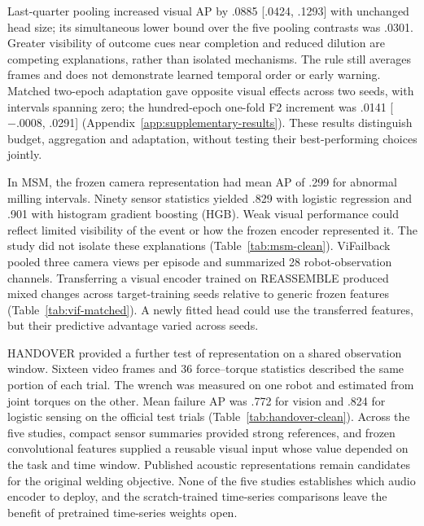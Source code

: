 Last-quarter pooling increased visual AP by .0885 [.0424, .1293] with unchanged head
size; its simultaneous lower bound over the five pooling contrasts was .0301. Greater
visibility of outcome cues near completion and reduced dilution are competing
explanations, rather than isolated mechanisms. The rule still averages frames and does
not demonstrate learned temporal order or early warning. Matched two-epoch adaptation
gave opposite visual effects across two seeds, with intervals spanning zero; the
hundred-epoch one-fold F2 increment was .0141 [$-.0008$, .0291]
(Appendix~\ref{app:supplementary-results}). These results distinguish budget,
aggregation and adaptation, without testing their best-performing choices jointly.

In MSM, the frozen camera representation had mean AP of .299 for abnormal milling
intervals. Ninety sensor statistics yielded .829 with logistic regression and .901 with
histogram gradient boosting (HGB). Weak visual performance could reflect limited
visibility of the event or how the frozen encoder represented it. The study did not
isolate these explanations (Table~\ref{tab:msm-clean}). ViFailback pooled three camera
views per episode and summarized 28 robot-observation channels. Transferring a visual
encoder trained on REASSEMBLE produced mixed changes across target-training seeds
relative to generic frozen features (Table~\ref{tab:vif-matched}). A newly fitted head
could use the transferred features, but their predictive advantage varied across seeds.

HANDOVER provided a further test of representation on a shared observation window.
Sixteen video frames and 36 force--torque statistics described the same portion of each
trial. The wrench was measured on one robot and estimated from joint torques on the
other. Mean failure AP was .772 for vision and .824 for logistic sensing on the official
test trials (Table~\ref{tab:handover-clean}). Across the five studies, compact sensor
summaries provided strong references, and frozen convolutional features supplied a
reusable visual input whose value depended on the task and time window. Published
acoustic representations remain candidates for the original welding objective. None of
the five studies establishes which audio encoder to deploy, and the scratch-trained
time-series comparisons leave the benefit of pretrained time-series weights open.

